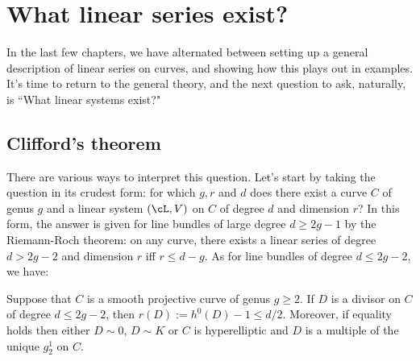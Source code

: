 
%
%
%
%
%
%

\chapter{What linear series exist?}\label{Brill-Noether}

In the last few chapters, we have alternated between setting up a general description of linear series on curves, and showing how this plays out in examples. It's time to return to the general theory, and the next question to ask, naturally, is ``What linear systems exist?"

\section{Clifford's theorem}


There are various ways to interpret this question. Let's start by taking the question in its crudest form: for which $g, r$ and $d$ does there exist a curve $C$ of genus $g$ and a linear system $(\cL,V)$ on $C$ of degree $d$ and dimension $r$? In this form, the answer is given for line bundles of large degree $d \geq 2g-1$ by the Riemann-Roch theorem: on any curve, there exists a linear series of degree $d > 2g-2$ and dimension $r$ iff $r \leq d-g$. As for line bundles of degree $d \leq 2g-2$, we have:

\begin{theorem}\label{Clifford}
Suppose that $C$ is a smooth projective curve of genus $g\geq 2$. If $D$ is a divisor on $C$ of degree $d \leq 2g-2$, then $r(D) := h^0(D) - 1 \leq d/2$. Moreover, if equality holds then either $D\sim 0$, $D\sim K$ or
 $C$ is hyperelliptic and $D$ is a multiple of the unique $g^1_2$ on $C$.
\end{theorem}

